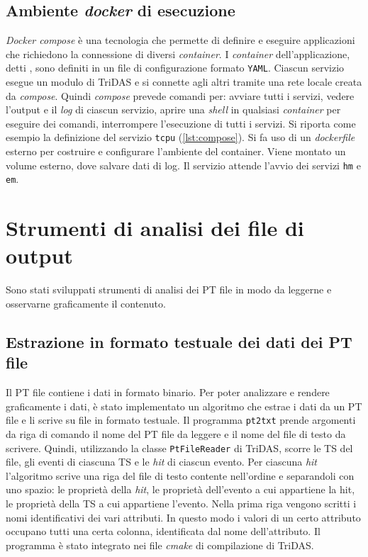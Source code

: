 \documentclass[../main.tex]{subfiles}
\begin{document}
\subsection{Ambiente \emph{docker} di esecuzione}
\emph{Docker compose} è una tecnologia che permette di definire e eseguire applicazioni che richiedono la connessione di diversi \emph{container}. I \emph{container} dell'applicazione, detti , sono definiti in un file di configurazione formato \texttt{YAML}. Ciascun servizio esegue un modulo di TriDAS e si connette agli altri tramite una rete locale creata da \emph{compose}. Quindi \emph{compose} prevede comandi per: avviare tutti i servizi, vedere l'output e il \emph{log} di ciascun servizio, aprire una \emph{shell} in qualsiasi \emph{container} per eseguire dei comandi, interrompere l'esecuzione di tutti i servizi.  
Si riporta come esempio la definizione del servizio \texttt{tcpu} (\autoref{lst:compose}). Si fa uso di un \emph{dockerfile} esterno per costruire e configurare l'ambiente del container. Viene montato un volume esterno, dove salvare dati di log. Il servizio attende l'avvio dei servizi \texttt{hm} e \texttt{em}.  

\section{Strumenti di analisi dei file di output}
Sono stati sviluppati strumenti di analisi dei PT file in modo da leggerne e osservarne graficamente il contenuto.
\subsection{Estrazione in formato testuale dei dati dei PT file}
Il PT file contiene i dati in formato binario. Per poter analizzare e rendere graficamente i dati, è stato implementato un algoritmo che estrae i dati da un PT file e li scrive su file in formato testuale.
Il programma \texttt{pt2txt} prende argomenti da riga di comando il nome del PT file da leggere e il nome del file di testo da scrivere. 
Quindi, utilizzando la classe \texttt{PtFileReader} di TriDAS, scorre le TS del file, gli eventi di ciascuna TS e le \emph{hit} di ciascun evento. Per ciascuna \emph{hit} l'algoritmo scrive una riga del file di testo contente nell'ordine e separandoli con uno spazio: le proprietà della \emph{hit}, le proprietà dell'evento a cui appartiene la hit, le proprietà della TS a cui appartiene l'evento.
Nella prima riga vengono scritti i nomi identificativi dei vari attributi. In questo modo i valori di un certo attributo occupano tutti una certa colonna, identificata dal nome dell'attributo.
Il programma è stato integrato nei file \emph{cmake} di compilazione di TriDAS.
\end{document}
